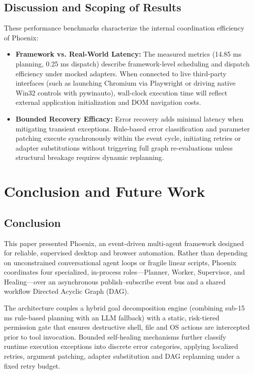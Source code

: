 \documentclass[conference]{IEEEtran}
\begin{document}
\subsection{Discussion and Scoping of Results}
These performance benchmarks characterize the internal coordination efficiency of Phoenix:
\begin{itemize}
    \item \textbf{Framework vs. Real-World Latency:} The measured metrics (14.85 ms planning, 0.25 ms dispatch) describe framework-level scheduling and dispatch efficiency under mocked adapters. When connected to live third-party interfaces (such as launching Chromium via Playwright or driving native Win32 controls with pywinauto), wall-clock execution time will reflect external application initialization and DOM navigation costs.
    \item \textbf{Bounded Recovery Efficacy:} Error recovery adds minimal latency when mitigating transient exceptions. Rule-based error classification and parameter patching execute synchronously within the event cycle, initiating retries or adapter substitutions without triggering full graph re-evaluations unless structural breakage requires dynamic replanning.
\end{itemize}

\section{Conclusion and Future Work}
\subsection{Conclusion}
This paper presented Phoenix, an event-driven multi-agent framework designed for reliable, supervised desktop and browser automation. Rather than depending on unconstrained conversational agent loops or fragile linear scripts, Phoenix coordinates four specialized, in-process roles—Planner, Worker, Supervisor, and Healing—over an asynchronous publish--subscribe event bus and a shared workflow Directed Acyclic Graph (DAG).

The architecture couples a hybrid goal decomposition engine (combining sub-15 ms rule-based planning with an LLM fallback) with a static, risk-tiered permission gate that ensures destructive shell, file and OS actions are intercepted prior to tool invocation. Bounded self-healing mechanisms further classify runtime execution exceptions into discrete error categories, applying localized retries, argument patching, adapter substitution and DAG replanning under a fixed retry budget.
\end{document}
